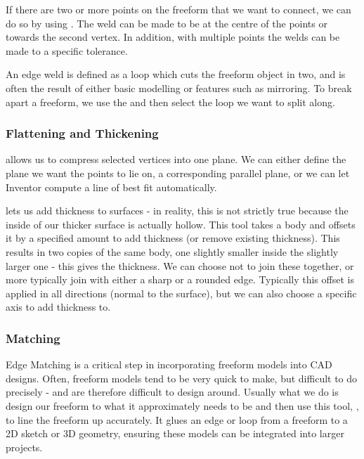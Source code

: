 If there are two or more points on the freeform that we want to connect, we can do so by using . The weld can be made to be at the centre of the points or towards the second vertex. In addition, with multiple points the welds can be made to a specific tolerance. 

An edge weld is defined as a loop which cuts the freeform object in two, and is often the result of either basic modelling or features such as mirroring. To break apart a freeform, we use the  and then select the loop we want to split along. 


\subsubsection{Flattening and Thickening}

 allows us to compress selected vertices into one plane. We can either define the plane we want the points to lie on, a corresponding parallel plane, or we can let Inventor compute a line of best fit automatically.

 lets us add thickness to surfaces - in reality, this is not strictly true because the inside of our thicker surface is actually hollow. This tool takes a body and offsets it by a specified amount to add thickness (or remove existing thickness). This results in two copies of the same body, one slightly smaller inside the slightly larger one - this gives the thickness. We can choose not to join these together, or more typically join with either a sharp or a rounded edge. Typically this offset is applied in all directions (normal to the surface), but we can also choose a specific axis to add thickness to.

\subsubsection{Matching}

Edge Matching is a critical step in incorporating freeform models into CAD designs. Often, freeform models tend to be very quick to make, but difficult to do precisely - and are therefore difficult to design around. Usually what we do is design our freeform to what it approximately needs to be and then use this tool, , to line the freeform up accurately. It glues an edge or loop from a freeform to a 2D sketch or 3D geometry, ensuring these models can be integrated into larger projects. 

